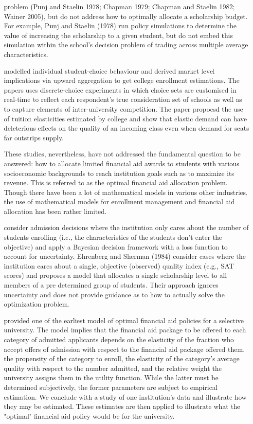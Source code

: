 \documentclass[12pt,english]{report}
\begin{document}
problem (Punj and Staelin 1978; Chapman 1979; Chapman and Staelin 1982; Wainer
2005), but do not address how  to optimally allocate a scholarship budget. For
example, Punj and Staelin (1978) run policy simulations to determine the value
of increasing the scholarship to a given student, but do not embed this
simulation within the school's decision problem of trading across multiple
average characteristics.

\citet{Carter2011} modelled individual student-choice behaviour and derived
market level implications via upward aggregation to get college enrollment
estimations. The papers uses discrete-choice experiments in which choice sets
are customised in real-time to reflect each respondent's true consideration set
of schools as well as to capture elements of inter-university competition.  The
paper propoesd the use of tuition elasticities estimated by college and show
that elastic demand can have deleterious effects on the quality of an incoming
class even when demand for seats far outstrips supply.

\vspace{0.25in}
These studies, nevertheless, have not addressed the fundamental question to be
answered: how to allocate limited financial aid awards to students with various
socioeconomic backgrounds to reach institution goals such as to maximize its
revenue. This is referred to as the optimal financial aid allocation problem.
Though there have been a lot of mathematical models in various other
industries, the use of mathematical models for enrollment management and
financial aid allocation has been rather limited.

\citet{Marsh2004} consider admission decisions where the institution only cares
about the number of students  enrolling (i.e., the characteristics of the
students don't enter the objective) and apply a Bayesian decision framework
with a loss function to account for uncertainty. Ehrenberg and Sherman (1984)
consider cases where the institution cares about a single, objective (observed)
quality index (e.g., SAT scores) and proposes a model that allocates a single
scholarship level to all members of a pre determined group of students. Their
approach ignores uncertainty and does not provide guidance as to how to
actually solve the optimization problem.

\citet{Ehrenberg1984} provided one of the earliest model of optimal financial
aid policies for a selective university. The model implies that the financial
aid package to be offered to each category of admitted applicants depends on
the elasticity of the fraction who accept offers of admission with respect to
the financial aid package offered them, the propensity of the category to
enroll, the elasticity of the category's average quality with respect to the
number admitted, and the relative weight the university assigns them in the
utility function. While the latter must be determined subjectively, the former
parameters are subject to empirical estimation. We conclude with a study of one
institution's data and illustrate how they may be estimated. These estimates
are then applied to illustrate what the "optimal" financial aid policy would be
for the university.
\end{document}
